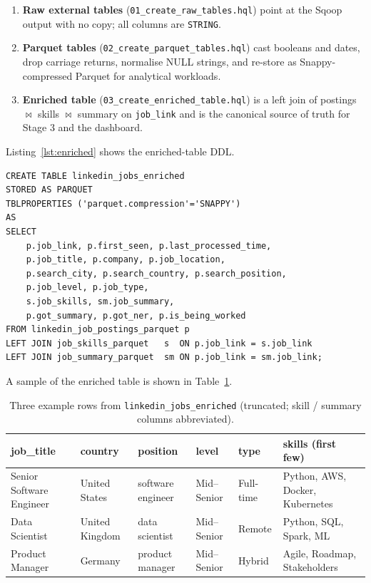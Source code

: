 \documentclass[11pt,a4paper]{article}
\begin{document}
\begin{enumerate}[leftmargin=*]
  \item \textbf{Raw external tables}
    (\texttt{01\_create\_raw\_tables.hql}) point at the Sqoop output
    with no copy; all columns are \texttt{STRING}.
  \item \textbf{Parquet tables}
    (\texttt{02\_create\_parquet\_tables.hql}) cast booleans and
    dates, drop carriage returns, normalise NULL strings, and
    re-store as Snappy-compressed Parquet for analytical workloads.
  \item \textbf{Enriched table}
    (\texttt{03\_create\_enriched\_table.hql}) is a left join of
    postings $\bowtie$ skills $\bowtie$ summary on \texttt{job\_link}
    and is the canonical source of truth for Stage 3 and the
    dashboard.
\end{enumerate}

Listing~\ref{lst:enriched} shows the enriched-table DDL.

\begin{lstlisting}[style=sql,caption={Enriched Hive table
construction.},label={lst:enriched}]
CREATE TABLE linkedin_jobs_enriched
STORED AS PARQUET
TBLPROPERTIES ('parquet.compression'='SNAPPY')
AS
SELECT
    p.job_link, p.first_seen, p.last_processed_time,
    p.job_title, p.company, p.job_location,
    p.search_city, p.search_country, p.search_position,
    p.job_level, p.job_type,
    s.job_skills, sm.job_summary,
    p.got_summary, p.got_ner, p.is_being_worked
FROM linkedin_job_postings_parquet p
LEFT JOIN job_skills_parquet   s  ON p.job_link = s.job_link
LEFT JOIN job_summary_parquet  sm ON p.job_link = sm.job_link;
\end{lstlisting}

A sample of the enriched table is shown in
Table~\ref{tab:enriched-sample}.

\begin{table}[h]
\centering
\caption{Three example rows from \texttt{linkedin\_jobs\_enriched}
(truncated; skill / summary columns abbreviated).}
\label{tab:enriched-sample}
\scriptsize
\begin{tabularx}{\linewidth}{l l l l l X}
\toprule
\textbf{job\_title} & \textbf{country} & \textbf{position} & \textbf{level} & \textbf{type} & \textbf{skills (first few)} \\
\midrule
Senior Software Engineer & United States   & software engineer & Mid--Senior & Full-time & Python, AWS, Docker, Kubernetes \\
Data Scientist           & United Kingdom  & data scientist    & Mid--Senior & Remote     & Python, SQL, Spark, ML \\
Product Manager          & Germany         & product manager   & Mid--Senior & Hybrid     & Agile, Roadmap, Stakeholders \\
\bottomrule
\end{tabularx}
\end{table}
\end{document}
